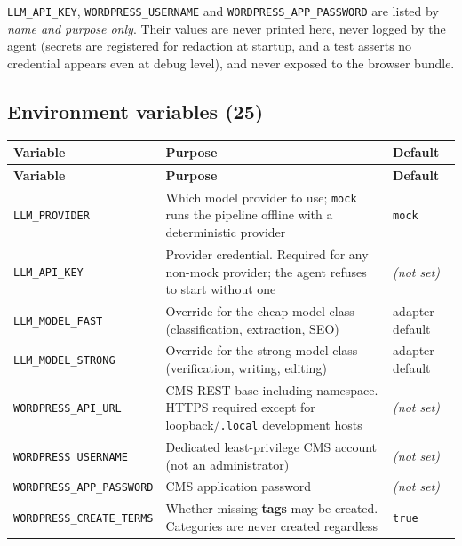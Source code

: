 \documentclass[11pt,a4paper]{article}
\newcommand{\var}[1]{\texttt{\small\hyphenpenalty=0\exhyphenpenalty=0\relax #1}}
\newcommand{\us}{\_\discretionary{}{}{}}
\newcommand{\brk}{\hyphenpenalty=0\exhyphenpenalty=0\relax}
\newcommand{\code}[1]{\texttt{\small\brk #1}}
\begin{document}
\begin{blockbox}
\var{LLM\us API\us KEY}, \var{WORDPRESS\us USERNAME} and
\var{WORDPRESS\us APP\us PASSWORD} are listed by \emph{name and purpose only}.
Their values are never printed here, never logged by the agent (secrets are
registered for redaction at startup, and a test asserts no credential appears even
at debug level), and never exposed to the browser bundle.
\end{blockbox}

\subsection{Environment variables (25)}

\begin{center}
\footnotesize
\begin{longtable}{@{}>{\RaggedRight}p{5.4cm} >{\RaggedRight}p{6.2cm} >{\RaggedRight}p{3.5cm}@{}}
\toprule
\textbf{Variable} & \textbf{Purpose} & \textbf{Default} \\
\midrule
\endfirsthead
\toprule
\textbf{Variable} & \textbf{Purpose} & \textbf{Default} \\
\midrule
\endhead
\var{LLM\us PROVIDER} & Which model provider to use; \code{mock} runs the pipeline
  offline with a deterministic provider & \code{mock} \\
\var{LLM\us API\us KEY} & Provider credential. Required for any non-mock provider;
  the agent refuses to start without one & \textit{(not set)} \\
\var{LLM\us MODEL\us FAST} & Override for the cheap model class (classification,
  extraction, SEO) & adapter default \\
\var{LLM\us MODEL\us STRONG} & Override for the strong model class (verification,
  writing, editing) & adapter default \\
\var{WORDPRESS\us API\us URL} & CMS REST base including namespace. HTTPS required
  except for loopback/\code{.local} development hosts & \textit{(not set)} \\
\var{WORDPRESS\us USERNAME} & Dedicated least-privilege CMS account (not an
  administrator) & \textit{(not set)} \\
\var{WORDPRESS\us APP\us PASSWORD} & CMS application password & \textit{(not set)} \\
\var{WORDPRESS\us CREATE\us TERMS} & Whether missing \textbf{tags} may be created.
  Categories are never created regardless & \code{true} \\

\end{longtable}
\end{center}
\end{document}
